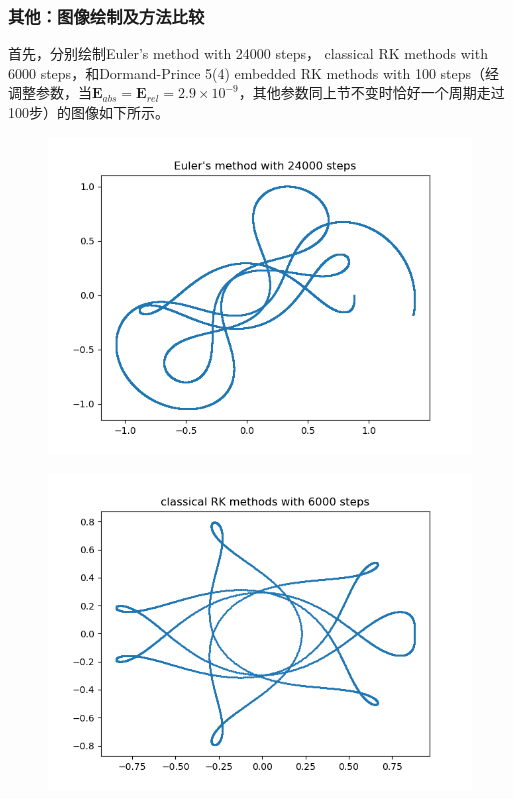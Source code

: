 \documentclass{ctexart}
\begin{document}
\begin{sloppypar}
\subsubsection{其他：图像绘制及方法比较}
首先，分别绘制Euler's method with 24000 steps， classical RK methods with 6000 steps，和Dormand-Prince 5(4) embedded RK methods with 100 steps（经调整参数，当$\mathbf{E}_{abs}=\mathbf{E}_{rel}=2.9 \times 10^{-9}$，其他参数同上节不变时恰好一个周期走过100步）的图像如下所示。
\begin{figure}[H]
\centering
\includegraphics[scale = 0.45]{./report_src/Figure_76.png}
\end{figure}
\begin{figure}[H]
\centering
\includegraphics[scale = 0.45]{./report_src/Figure_77.png}

\end{figure}
\end{sloppypar}
\end{document}
